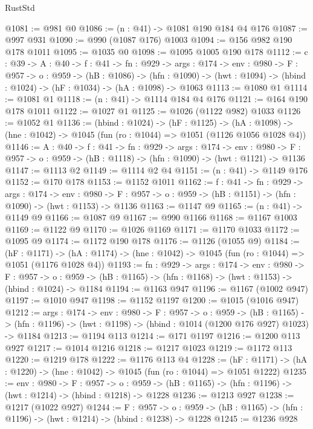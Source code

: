 \begin{lexlean}{RustStd}
\begin{coremodule}
@1081 := @981 @0
@1086 := (n : @41) -> @1081 @190 @184 @4 @176
@1087 := @997 @931
@1090 := @990 (@1087 @176) @1003
@1094 := @156 @982 @190 @178 @1011
@1095 := @1035 @0
@1098 := @1095 @1005 @190 @178
@1112 := {c : @39} ->
  {A : @40} ->
  {f : @41} ->
  {fn : @929} ->
  {args : @174} ->
  {env : @980} ->
  {F : @957} ->
  {o : @959} ->
  (hB : @1086) ->
  (hfn : @1090) -> (hwt : @1094) -> (hbind : @1024) -> (hF : @1034) -> (hA : @1098) -> @1063
@1113 := @1080 @1
@1114 := @1081 @1
@1118 := (n : @41) -> @1114 @184 @4 @176
@1121 := @164 @190 @178 @1011
@1122 := @1027 @1
@1125 := @1026 (@1122 @982) @1033
@1126 := @1052 @1
@1136 := (hbind : @1024) ->
  (hF : @1125) ->
  (hA : @1098) -> (hne : @1042) -> @1045 (fun (ro : @1044) => @1051 (@1126 @1056 @1028 @4))
@1146 := {A : @40} ->
  {f : @41} ->
  {fn : @929} ->
  {args : @174} ->
  {env : @980} ->
  {F : @957} -> {o : @959} -> (hB : @1118) -> (hfn : @1090) -> (hwt : @1121) -> @1136
@1147 := @1113 @2
@1149 := @1114 @2 @4
@1151 := (n : @41) -> @1149 @176
@1152 := @170 @178
@1153 := @1152 @1011
@1162 := {f : @41} ->
  {fn : @929} ->
  {args : @174} ->
  {env : @980} ->
  {F : @957} -> {o : @959} -> (hB : @1151) -> (hfn : @1090) -> (hwt : @1153) -> @1136
@1163 := @1147 @9
@1165 := (n : @41) -> @1149 @9
@1166 := @1087 @9
@1167 := @990 @1166
@1168 := @1167 @1003
@1169 := @1122 @9
@1170 := @1026 @1169
@1171 := @1170 @1033
@1172 := @1095 @9
@1174 := @1172 @190 @178
@1176 := @1126 (@1055 @9)
@1184 := (hF : @1171) ->
  (hA : @1174) -> (hne : @1042) -> @1045 (fun (ro : @1044) => @1051 (@1176 @1028 @4))
@1193 := {fn : @929} ->
  {args : @174} ->
  {env : @980} ->
  {F : @957} ->
  {o : @959} -> (hB : @1165) -> (hfn : @1168) -> (hwt : @1153) -> (hbind : @1024) -> @1184
@1194 := @1163 @947
@1196 := @1167 (@1002 @947)
@1197 := @1010 @947
@1198 := @1152 @1197
@1200 := @1015 (@1016 @947)
@1212 := {args : @174} ->
  {env : @980} ->
  {F : @957} ->
  {o : @959} ->
  (hB : @1165) -> (hfn : @1196) -> (hwt : @1198) -> (hbind : @1014 (@1200 @176 @927) @1023) -> @1184
@1213 := @1194 @113
@1214 := @171 @1197
@1216 := @1200 @113 @927
@1217 := @1014 @1216
@1218 := @1217 @1023
@1219 := @1172 @113
@1220 := @1219 @178
@1222 := @1176 @113 @4
@1228 := (hF : @1171) -> (hA : @1220) -> (hne : @1042) -> @1045 (fun (ro : @1044) => @1051 @1222)
@1235 := {env : @980} ->
  {F : @957} ->
  {o : @959} -> (hB : @1165) -> (hfn : @1196) -> (hwt : @1214) -> (hbind : @1218) -> @1228
@1236 := @1213 @927
@1238 := @1217 (@1022 @927)
@1244 := {F : @957} ->
  {o : @959} -> (hB : @1165) -> (hfn : @1196) -> (hwt : @1214) -> (hbind : @1238) -> @1228
@1245 := @1236 @928

\end{coremodule}
\end{lexlean}
